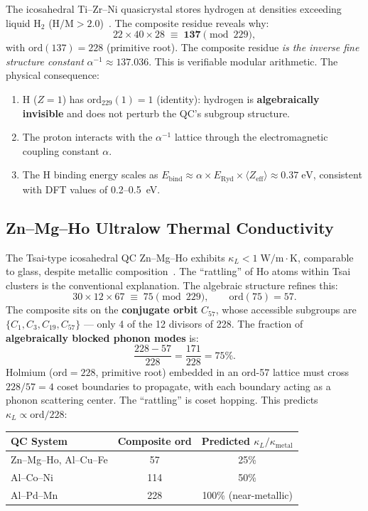 The icosahedral Ti--Zr--Ni quasicrystal stores hydrogen at densities exceeding liquid H$_2$ ($\mathrm{H/M} > 2.0$)~\cite{Viano95}.  The composite residue reveals why:
\[
22 \times 40 \times 28 \;\equiv\; \mathbf{137} \pmod{229},
\]
with $\mathrm{ord}(137) = 228$ (primitive root).  The composite residue \emph{is the inverse fine structure constant} $\alpha^{-1} \approx 137.036$.  This is verifiable modular arithmetic.  The physical consequence:
\begin{enumerate}
  \item H ($Z=1$) has $\mathrm{ord}_{229}(1) = 1$ (identity): hydrogen is \textbf{algebraically invisible} and does not perturb the QC's subgroup structure.
  \item The proton interacts with the $\alpha^{-1}$ lattice through the electromagnetic coupling constant $\alpha$.
  \item The H binding energy scales as $E_{\mathrm{bind}} \approx \alpha \times E_{\mathrm{Ryd}} \times \langle Z_{\mathrm{eff}}\rangle \approx 0.37\;\mathrm{eV}$, consistent with DFT values of 0.2--0.5~eV.
\end{enumerate}


\subsection{Zn--Mg--Ho Ultralow Thermal Conductivity}
\label{sec:znmgho-kappa}

The Tsai-type icosahedral QC Zn--Mg--Ho exhibits $\kappa_L < 1\;\mathrm{W/m{\cdot}K}$, comparable to glass, despite metallic composition~\cite{Tsai04}.  The ``rattling'' of Ho atoms within Tsai clusters is the conventional explanation.  The algebraic structure refines this:
\[
30 \times 12 \times 67 \;\equiv\; 75 \pmod{229}, \qquad \mathrm{ord}(75) = 57.
\]
The composite sits on the \textbf{conjugate orbit} $C_{57}$, whose accessible subgroups are $\{C_1, C_3, C_{19}, C_{57}\}$ --- only 4 of the 12 divisors of 228.  The fraction of \textbf{algebraically blocked phonon modes} is:
\[
\frac{228 - 57}{228} = \frac{171}{228} = 75\%.
\]
Holmium ($\mathrm{ord} = 228$, primitive root) embedded in an $\mathrm{ord}$-57 lattice must cross $228/57 = 4$ coset boundaries to propagate, with each boundary acting as a phonon scattering center.  The ``rattling'' is coset hopping.  This predicts $\kappa_L \propto \mathrm{ord}/228$:
\begin{center}
\begin{tabular}{lcc}
\toprule
QC System & Composite ord & Predicted $\kappa_L/\kappa_{\mathrm{metal}}$ \\
\midrule
Zn--Mg--Ho, Al--Cu--Fe & 57 & 25\% \\
Al--Co--Ni & 114 & 50\% \\
Al--Pd--Mn & 228 & 100\% (near-metallic) \\
\bottomrule
\end{tabular}
\end{center}

